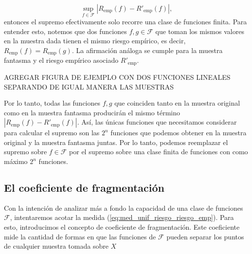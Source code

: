 \documentclass{article}
\begin{document}
\[
\sup_{f \in \mathcal{F}} |R_{\text{emp}}(f) - R'_{\text{emp}}(f)|,
\]
entonces el supremo efectivamente solo recorre una clase de funciones finita. Para entender esto, notemos que 
dos funciones \(f, g \in \mathcal{F}\) que toman los mismos valores en la muestra dada tienen el mismo riesgo empírico, 
es decir, \(R_{\text{emp}}(f) = R_{\text{emp}}(g)\). La afirmación análoga se cumple para la muestra fantasma 
y el riesgo empírico asociado \(R'_{\text{emp}}\). \newline

AGREGAR FIGURA DE EJEMPLO CON DOS FUNCIONES LINEALES SEPARANDO DE IGUAL MANERA LAS MUESTRAS\newline

Por lo tanto, todas las funciones \(f, g\) que coinciden tanto en la muestra original como en la muestra fantasma 
producirán el mismo término \(|R_{\text{emp}}(f) - R'_{\text{emp}}(f)|\). Así, las únicas funciones que 
necesitamos considerar para calcular el supremo son las \(2^{n}\) funciones que podemos obtener en la muestra 
original y la muestra fantasma juntas. Por lo tanto, podemos reemplazar el supremo sobre \(f \in \mathcal{F}\) por el 
supremo sobre una clase finita de funciones con como máximo \(2^{n}\) funciones.\newline


\subsection{ El coeficiente de fragmentación}

Con la intención de analizar más a fondo la capacidad de una clase de funciones 
\(\mathcal{F}\), intentaremos acotar la medida (\ref{eq:med_unif_riesgo_riesgo_emp}).
Para esto, introducimos el concepto de coeficiente de fragmentación.  Este coeficiente mide la 
cantidad de formas en que las funciones de \(\mathcal{F}\) pueden separar los puntos de cualquier muestra
tomada sobre $X$\newline
\end{document}
